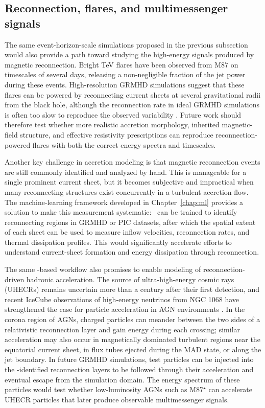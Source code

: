 \subsection{Reconnection, flares, and multimessenger signals}

The same event-horizon-scale simulations proposed in the previous subsection would also provide a path toward studying the high-energy signals produced by magnetic reconnection.
Bright TeV flares have been observed from M87 on timescales of several days, releasing a non-negligible fraction of the jet power during these events.
High-resolution GRMHD simulations suggest that these flares can be powered by reconnecting current sheets at several gravitational radii from the black hole, although the reconnection rate in ideal GRMHD simulations is often too slow to reproduce the observed variability \citep[e.g.,][]{ripperda_black_2022}.
Future work should therefore test whether more realistic accretion morphology, inherited magnetic-field structure, and effective resistivity prescriptions can reproduce reconnection-powered flares with both the correct energy spectra and timescales.

Another key challenge in accretion modeling is that magnetic reconnection events are still commonly identified and analyzed by hand.
This is manageable for a single prominent current sheet, but it becomes subjective and impractical when many reconnecting structures exist concurrently in a turbulent accretion flow.
The machine-learning framework developed in Chapter~\ref{chap:ml} provides a solution to make this measurement systematic: \awesom\ can be trained to identify reconnecting regions in GRMHD or PIC datasets, after which the spatial extent of each sheet can be used to measure inflow velocities, reconnection rates, and thermal dissipation profiles.
This would significantly accelerate efforts to understand current-sheet formation and energy dissipation through reconnection.

The same \awesom-based workflow also promises to enable modeling of reconnection-driven hadronic acceleration.
The source of ultra-high-energy cosmic rays (UHECRs) remains uncertain more than a century after their first detection, and recent IceCube observations of high-energy neutrinos from NGC 1068 have strengthened the case for particle acceleration in AGN environments \citep{collaboration_evidence_2022}.
In the corona region of AGNs, charged particles can meander between the two sides of a relativistic reconnection layer and gain energy during each crossing; similar acceleration may also occur in magnetically dominated turbulent regions near the equatorial current sheet, in flux tubes ejected during the MAD state, or along the jet boundary.
In future GRMHD simulations, test particles can be injected into the \awesom-identified reconnection layers to be followed through their acceleration and eventual escape from the simulation domain.
The energy spectrum of these particles would test whether low-luminosity AGNs such as M87$^{\star}$ can accelerate UHECR particles that later produce observable multimessenger signals.

